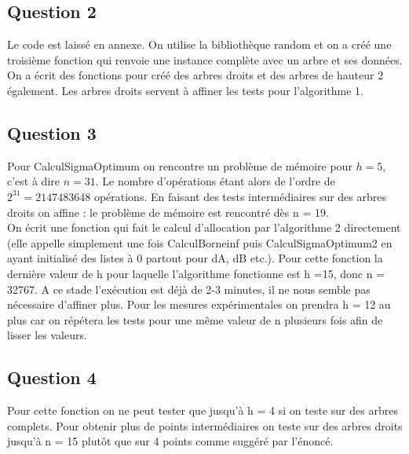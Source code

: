 \documentclass{article}
\begin{document}
\subsection{Question 2}
Le code est laissé en annexe. On utilise la bibliothèque random et on a créé une troisième fonction qui renvoie une instance complète avec un arbre et ses données. On a écrit des fonctions pour créé des arbres droits et des arbres de hauteur 2 également. Les arbres droits servent à affiner les tests pour l'algorithme 1.
\subsection{Question 3}
Pour CalculSigmaOptimum on rencontre un problème de mémoire pour $h = 5$, c'est à dire $n = 31$. Le nombre d'opérations étant alors de l'ordre de $2^{31} = 2147483648$ opérations. En faisant des tests intermédiaires sur des arbres droits on affine : le problème de mémoire est rencontré dès n = 19. \\
On écrit une fonction qui fait le calcul d'allocation par l'algorithme 2 directement (elle appelle simplement une fois CalculBorneinf puis CalculSigmaOptimum2 en ayant initialisé des listes à 0 partout pour dA, dB etc.).
Pour cette fonction la dernière valeur de h pour laquelle l'algorithme fonctionne est h =15, donc n = 32767. A ce stade l'exécution est déjà de 2-3 minutes, il ne nous semble pas nécessaire d'affiner plus. Pour les mesures expérimentales on prendra h = 12 au plus car on répétera les tests pour une même valeur de n plusieurs fois afin de lisser les valeurs.

\subsection{Question 4}
Pour cette fonction on ne peut tester que jusqu'à h = 4 si on teste sur des arbres complets. 
Pour obtenir plus de points intermédiaires on teste sur des arbres droits jusqu'à n = 15 plutôt que sur 4 points comme suggéré par l'énoncé.
\end{document}
